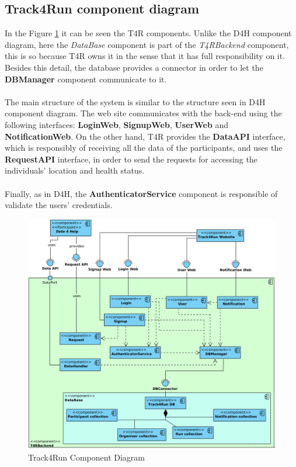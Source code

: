 \documentclass[a4paper, hidelinks, 12pt]{report}
\begin{document}
		\subsection{Track4Run component diagram}	
			In the Figure \ref{fig:t4r_component_diagram} it can be seen the T4R components. Unlike the D4H component diagram, here the \textit{DataBase} component is part of the \textit{T4RBackend} component, this is so because T4R owns it in the sense that it has full responsibility on it. Besides this detail, the database provides a connector in order to let the \textbf{DBManager} component communicate to it.\\\\
			The main structure of the system is similar to the structure seen in D4H component diagram. The web site communicates with the back-end using the following interfaces: \textbf{LoginWeb}, \textbf{SignupWeb}, \textbf{UserWeb} and \textbf{NotificationWeb}. On the other hand, T4R provides the \textbf{DataAPI} interface, which is responsibly of receiving all the data of the participants, and uses the \textbf{RequestAPI} interface, in order to send the requests for accessing the individuals' location and health status.\\\\
			Finally, as in D4H, the \textbf{AuthenticatorService} component is responsible of validate the users' credentials.
			\begin{figure}[H]
				\centering
				\includegraphics[width=1\textwidth]{diagrams/t4r_component_diagram.png}
				\caption[Track4Run Component Diagram]{Track4Run Component Diagram}
				\label{fig:t4r_component_diagram}
			\end{figure}	
			
\end{document}
